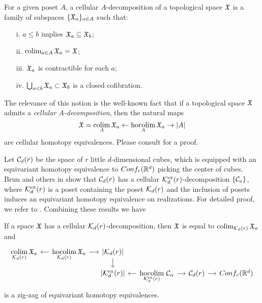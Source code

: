 \begin{definition}\label{cellulardecomposition}
	For a given poset $A$, a cellular $A$-decomposition of a topological space $\mathfrak{X}$ is a family of subspaces $\{\mathfrak{X}_a\}_{a \in A}$ such that:
	\begin{itemize}
		\item [i.] $a \leq b$ implies $\mathfrak{X}_a \subseteq \mathfrak{X}_b$;
		\item [ii.] $\operatorname*{colim}_{a \in A} \mathfrak{X}_a = \mathfrak{X}$;
		\item [iii.] $\mathfrak{X}_a$ is contractible for each $a$;
		\item [iv.] $\bigcup_{a<b} \mathfrak{X}_a \subset \mathfrak{X}_b$ is a closed cofibration.
	\end{itemize}
\end{definition}

The relevance of this notion is the well-known fact that if a topological space $\mathfrak{X}$ admits a \textit{cellular $A$-decomposition}, then the natural maps
\begin{equation}\label{e:cellular poset decomposition}
	\mathfrak{X} = \operatorname*{colim}_A \mathfrak{X}_a \leftarrow \operatorname*{hocolim}_A \mathfrak{X}_a \to \lvert A\rvert
\end{equation}
are cellular homotopy equivalences.
Please consult \cite[\S1.7]{berger1997confspacemodel} for a proof.

Let $\mathcal{C}_d(r)$ be the space of $r$ little $d$-dimensional cubes, which is equipped with an equivariant homotopy equivalence to $Conf_{r}(\mathbb{R}^{d})$ picking the center of cubes.
Brun and others in \cite{brunfiedorowiczvogt2007} show that $\mathcal{C}_d(r)$ has a cellular $\mathcal{K}^{\mathrm{ex}}_d(r)$-decomposition $\{\mathcal{C}_a\}$, where $\mathcal{K}^{\mathrm{ex}}_d(r)$ is a poset containing the poset $\mathcal{K}_d(r)$ and the inclusion of posets induces an equivariant homotopy equivalence on realizations. For detailed proof, we refer to \cite{beuckmoer2023}.
Combining these results we have

\begin{proposition}\label{p:zig-zag conf}
	If a space $\mathfrak{X}$ has a cellular $\mathcal{K}_d(r)$-decomposition, then $\mathfrak{X}$ is equal to $\operatorname*{colim}_{\mathcal{K}_d(r)} \mathfrak{X}_a$ and
	\begin{equation*}
		\begin{tikzcd}[column sep=small, row sep=5]
			\displaystyle \colim_{\CG_d(r)} \fX_a & \arrow[l] \displaystyle \hocolim_{\CG_d(r)} \fX_a \arrow[r] & \bars{\CG_d(r)} \arrow[d] & & \\ & &
			\bars{\CG^\ex_d(r)} & \arrow[l] \displaystyle \hocolim_{\CG^\ex_d(r)}\,\cC_\alpha \arrow[r] & \cC_d(r) \arrow[r] & \conf{r}{d}
		\end{tikzcd}
	\end{equation*}
	is a zig-zag of equivariant homotopy equivalences.
\end{proposition}

